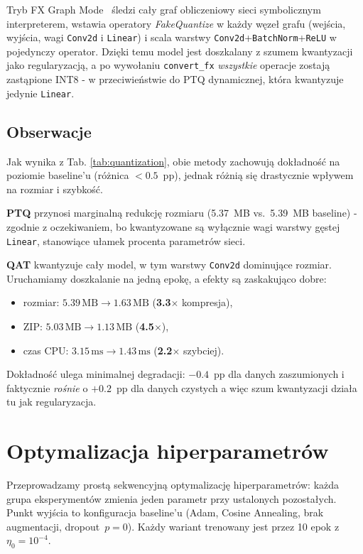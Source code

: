 \documentclass[12pt,twocolumn]{article}
\begin{document}
Tryb FX Graph Mode~\cite{pytorch2021fx} śledzi cały graf obliczeniowy
sieci symbolicznym interpreterem, wstawia operatory
\textit{FakeQuantize} w każdy węzeł grafu (wejścia, wyjścia, wagi
\texttt{Conv2d} i \texttt{Linear}) i scala warstwy
\texttt{Conv2d}+\texttt{BatchNorm}+\texttt{ReLU} w pojedynczy
operator. Dzięki temu model jest doszkalany z szumem kwantyzacji jako
regularyzacją, a po wywołaniu \texttt{convert\_fx} \emph{wszystkie}
operacje zostają zastąpione INT8 - w przeciwieństwie do PTQ dynamicznej,
która kwantyzuje jedynie \texttt{Linear}.



\subsection{Obserwacje}

Jak wynika z Tab. \ref{tab:quantization}, obie metody zachowują
dokładność na poziomie baseline'u (różnica $<0.5$~pp), jednak różnią się
drastycznie wpływem na rozmiar i szybkość.

\textbf{PTQ} przynosi marginalną redukcję rozmiaru
(5.37~MB vs.\ 5.39~MB baseline) - zgodnie z oczekiwaniem, bo
kwantyzowane są wyłącznie wagi warstwy gęstej \texttt{Linear}, stanowiące
ułamek procenta parametrów sieci.

\textbf{QAT} kwantyzuje cały model, w tym warstwy \texttt{Conv2d}
dominujące rozmiar. Uruchamiamy doszkalanie na jedną epokę, a efekty są zaskakująco dobre:
\begin{itemize}
  \item rozmiar: $5.39\,\text{MB} \to 1.63\,\text{MB}$ (\textbf{3.3$\times$} kompresja),
  \item ZIP: $5.03\,\text{MB} \to 1.13\,\text{MB}$ (\textbf{4.5$\times$}),
  \item czas CPU: $3.15\,\text{ms} \to 1.43\,\text{ms}$ (\textbf{2.2$\times$} szybciej).
\end{itemize}
Dokładność ulega minimalnej degradacji: $-0.4$~pp dla danych zaszumionych
i faktycznie \emph{rośnie} o $+0.2$~pp dla danych czystych a więc szum
kwantyzacji działa tu jak regularyzacja.

\section{Optymalizacja hiperparametrów}

Przeprowadzamy prostą sekwencyjną optymalizację hiperparametrów: każda grupa
eksperymentów zmienia jeden parametr przy ustalonych pozostałych.
Punkt wyjścia to konfiguracja baseline'u (Adam, Cosine Annealing, brak augmentacji,
dropout~$p=0$). Każdy wariant trenowany jest przez 10 epok z $\eta_0=10^{-4}$.
\end{document}
